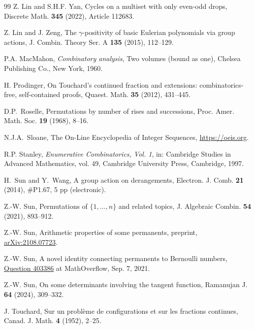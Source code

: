 \documentclass[11pt,reqno]{amsart}
\numberwithin{equation}{section}
\theoremstyle{plain}
\theoremstyle{definition}
\begin{document}
\begin{thebibliography}{99}
 Z. Lin and S.H.F. Yan, Cycles on a multiset with only even-odd drops, Discrete Math. {\bf 345} (2022), Article 112683.

 Z. Lin and J. Zeng, The $\gamma$-positivity of basic Eulerian polynomials via group actions, J. Combin. Theory Ser. A {\bf 135} (2015), 112--129.

 P.A. MacMahon, {\em Combinatory analysis}, Two volumes (bound as one), Chelsea Publishing Co., New York, 1960.


 H. Prodinger, On Touchard's continued fraction and extensions: combinatorics-free, self-contained proofs, Quaest. Math. {\bf 35} (2012),  431--445.

 D.P.~Roselle, Permutations by number of rises and successions, Proc. Amer. Math. Soc. {\bf 19} (1968), 8--16.

N.J.A.~Sloane,  The On-Line Encyclopedia of Integer Sequences,  \href{https://oeis.org}{https://oeis.org}.


 R.P. Stanley, {\it Enumerative Combinatorics, Vol. 1}, in: Cambridge Studies in Advanced Mathematics, vol. 49, Cambridge University Press, Cambridge, 1997.

 H.~Sun and Y.~Wang, A group action on derangements, Electron. J. Comb. {\bf 21} (2014),  \#P1.67, 5 pp (electronic).

 Z.-W. Sun, Permutations of $\{1,\ldots,n\}$ and related topics,
J. Algebraic Combin. {\bf 54} (2021), 893--912.

 Z.-W. Sun, Arithmetic properties of some permanents, preprint, \href{https://arxiv.org/abs/2108.07723}{arXiv:2108.07723}.

 Z.-W. Sun, A novel identity connecting permanents to Bernoulli numbers,
\href{https://mathoverflow.net/questions/403386/a-novel-identity-connecting-permanents-to-bernoulli-numbers}{Question 403386} at MathOverflow, Sep. 7, 2021.

 Z.-W. Sun, On some determinants involving the tangent function, Ramanujan J.
{\bf 64} (2024), 309--332.

 J. Touchard, Sur un probl\`eme de configurations et sur les fractions continues, Canad. J. Math. {\bf 4} (1952), 2--25.



\end{thebibliography}
\end{document}

